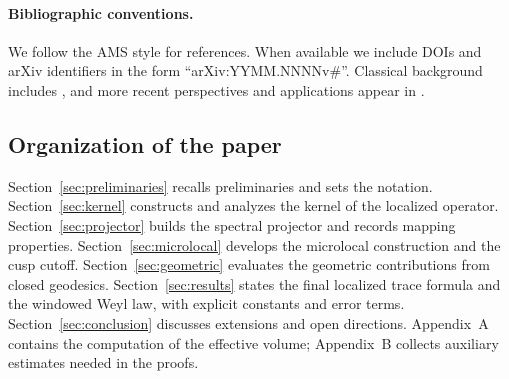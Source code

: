 \paragraph{Bibliographic conventions.}
We follow the AMS style for references. When available we include DOIs and arXiv
identifiers in the form ``arXiv:YYMM.NNNNv\#''. Classical background includes
\cite{selberg1956,hejhal1976,hejhal1983,mueller1983,buser1992,duistermaatguillemin1975,
hormander1994III,sogge1993,chazarain1974}, and more recent perspectives and applications
appear in \cite{iwaniec1995,canzanigalkowski2019,deleporte2024,gansemer2024,
le_masson2024,zhuwu2024,dyatlov2018,dyatlov2019,dyatlovzworski2019,zworski2012}.

\subsection{Organization of the paper}\label{subsec:outline}
Section~\ref{sec:preliminaries} recalls preliminaries and sets the notation.
Section~\ref{sec:kernel} constructs and analyzes the kernel of the localized operator.
Section~\ref{sec:projector} builds the spectral projector and records mapping properties.
Section~\ref{sec:microlocal} develops the microlocal construction and the cusp cutoff.
Section~\ref{sec:geometric} evaluates the geometric contributions from closed geodesics.
Section~\ref{sec:results} states the final localized trace formula and the windowed Weyl
law, with explicit constants and error terms. Section~\ref{sec:conclusion} discusses
extensions and open directions. Appendix~A contains the computation of the
effective volume; Appendix~B collects auxiliary estimates needed in the proofs.
